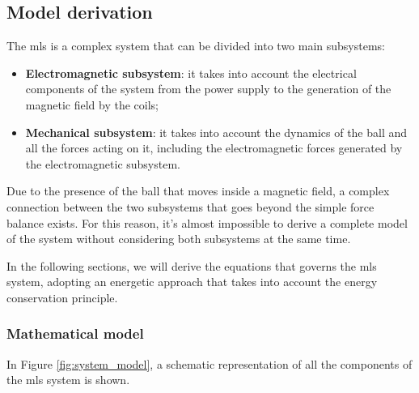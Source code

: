 \subsection{Model derivation}
\label{subsec:model_derivation}

The \acrshort{mls} is a complex system that can be divided into two main subsystems:

\begin{itemize}
    \item \textbf{Electromagnetic subsystem}: it takes into account the electrical components of the system from the power supply to the generation of the magnetic field by the coils;
    \item \textbf{Mechanical subsystem}: it takes into account the dynamics of the ball and all the forces acting on it, including the electromagnetic forces generated by the electromagnetic subsystem.
\end{itemize}

Due to the presence of the ball that moves inside a magnetic field, a complex connection between the two subsystems that goes beyond the simple force balance exists.
For this reason, it's almost impossible to derive a complete model of the system without considering both subsystems at the same time.

In the following sections, we will derive the equations that governs the \acrshort{mls} system, adopting an energetic approach that takes into account the energy conservation principle.

\subsubsection{Mathematical model}
\label{subsubsec:mathematical_model}

In Figure \ref{fig:system_model}, a schematic representation of all the components of the \acrshort{mls} system is shown.

